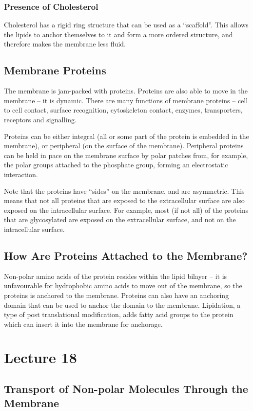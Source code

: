 \documentclass[a4paper, 12pt]{report}
\newcommand{\mychapter}[2]{
    \setcounter{chapter}{#1}
    \setcounter{section}{0}
    \chapter*{#2}
    \addcontentsline{toc}{chapter}{#2}
}
\begin{document}
\subsection{Presence of Cholesterol}

Cholesterol has a rigid ring structure that can be used as a ``scaffold''.
This allows the lipids to anchor themselves to it and form a more ordered structure, and therefore makes the membrane less fluid.

\section{Membrane Proteins}

The membrane is jam-packed with proteins.
Proteins are also able to move in the membrane -- it is dynamic.
There are many functions of membrane proteins -- cell to cell contact, surface recognition, cytoskeleton contact, enzymes, transporters, receptors and signalling.

Proteins can be either integral (all or some part of the protein is embedded in the membrane), or peripheral (on the surface of the membrane).
Peripheral proteins can be held in pace on the membrane surface by polar patches from, for example, the polar groups attached to the phosphate group, forming an electrostatic interaction.

Note that the proteins have ``sides'' on the membrane, and are asymmetric.
This means that not all proteins that are exposed to the extracellular surface are also exposed on the intracellular surface.
For example, most (if not all) of the proteins that are glycosylated are exposed on the extracellular surface, and not on the intracellular surface.

\section{How Are Proteins Attached to the Membrane?}

Non-polar amino acids of the protein resides within the lipid bilayer -- it is unfavourable for hydrophobic amino acids to move out of the membrane, so the proteins is anchored to the membrane.
Proteins can also have an anchoring domain that can be used to anchor the domain to the membrane.
Lipidation, a type of post translational modification, adds fatty acid groups to the protein which can insert it into the membrane for anchorage.

\mychapter{18}{Lecture 18}

\section{Transport of Non-polar Molecules Through the Membrane}
\end{document}
